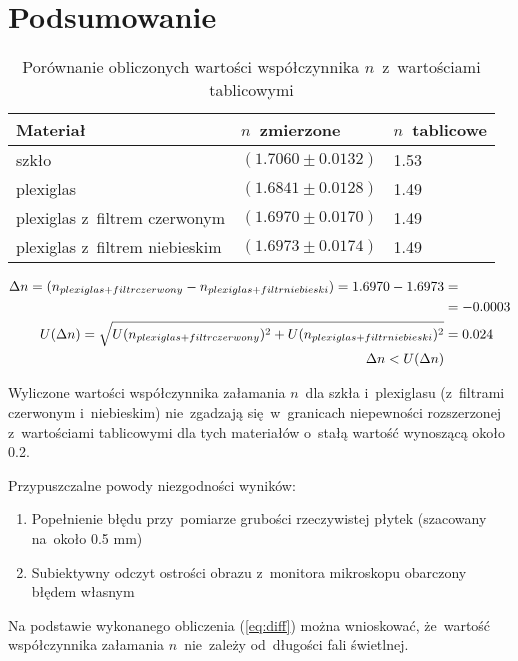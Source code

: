 \documentclass{fizraport}
\begin{document}
\section{Podsumowanie}
\begin{table}[h]
\centering
\caption{Porównanie obliczonych wartości współczynnika $n$~z~wartościami tablicowymi}
\begin{tabular}{|l|l|l|}
\hline
\textbf{Materiał}              & $n$~zmierzone    & $n$~tablicowe \\ \hline
szkło                          & $(1.7060\pm0.0132)$& 1.53        \\ \hline
plexiglas                      & $(1.6841\pm0.0128)$& 1.49        \\ \hline
plexiglas z~filtrem czerwonym  & $(1.6970\pm0.0170)$& 1.49        \\ \hline
plexiglas z~filtrem niebieskim & $(1.6973\pm0.0174)$& 1.49        \\ \hline
\end{tabular}
\end{table}

\begin{equation}
\label{eq:diff}
\begin{split}
\Large
    \Delta n=(n_{plexiglas+filtr czerwony}-n_{plexiglas+filtr niebieski})=1.6970-1.6973&=\\
    &=-0.0003 \\
    U(\Delta n)= \sqrt{ U(n_{plexiglas+filtr czerwony})^2 + U(n_{plexiglas+filtr niebieski})^2} &=0.024\\
    \Delta n < U(\Delta n)
\end{split}
\end{equation}

Wyliczone wartości współczynnika załamania $n$~dla szkła i~plexiglasu (z~filtrami czerwonym i~niebieskim) nie~zgadzają się~w~granicach niepewności rozszerzonej z~wartościami tablicowymi dla tych materiałów o~stałą wartość wynoszącą około 0.2.

Przypuszczalne powody niezgodności wyników:
\begin{enumerate}
    \item Popełnienie błędu przy~pomiarze grubości rzeczywistej płytek (szacowany na~około 0.5 mm)
    \item Subiektywny odczyt ostrości obrazu z~monitora mikroskopu obarczony błędem własnym
\end{enumerate}

Na podstawie wykonanego obliczenia (\ref{eq:diff}) można wnioskować, że~wartość współczynnika załamania $n$~nie~zależy od~długości fali świetlnej.
\end{document}
